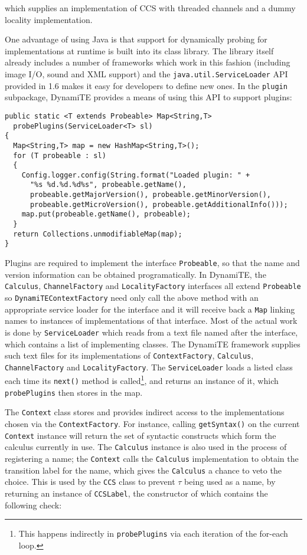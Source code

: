 \noindent which supplies an implementation of CCS with threaded
channels and a dummy locality implementation.

One advantage of using Java is that support for dynamically probing
for implementations at runtime is built into its class library.  The
library itself already includes a number of frameworks which work in
this fashion (including image I/O, sound and XML support) and the
\texttt{java.util.ServiceLoader} API provided in 1.6 makes it easy for
developers to define new ones.  In the \texttt{plugin} subpackage,
DynamiTE provides a means of using this API to support plugins:

\begin{verbatim}
public static <T extends Probeable> Map<String,T>
  probePlugins(ServiceLoader<T> sl)
{
  Map<String,T> map = new HashMap<String,T>();
  for (T probeable : sl)
  {
    Config.logger.config(String.format("Loaded plugin: " +
      "%s %d.%d.%d%s", probeable.getName(),
      probeable.getMajorVersion(), probeable.getMinorVersion(),
      probeable.getMicroVersion(), probeable.getAdditionalInfo()));
    map.put(probeable.getName(), probeable);
  }
  return Collections.unmodifiableMap(map);
}
\end{verbatim}

\noindent Plugins are required to implement the interface
\texttt{Probeable}, so that the name and version information can be
obtained programatically.  In DynamiTE, the \texttt{Calculus},
\texttt{ChannelFactory} and \texttt{LocalityFactory} interfaces all
extend \texttt{Probeable} so \texttt{DynamiTEContextFactory} need only
call the above method with an appropriate service loader for the
interface and it will receive back a \texttt{Map} linking names to
instances of implementations of that interface.  Most of the actual
work is done by \texttt{ServiceLoader} which reads from a text file
named after the interface, which contains a list of implementing
classes.  The DynamiTE framework supplies such text files for its
implementations of \texttt{ContextFactory}, \texttt{Calculus},
\texttt{ChannelFactory} and \texttt{LocalityFactory}.  The
\texttt{ServiceLoader} loads a listed class each time its
\texttt{next()} method is called\footnote{This happens indirectly in
  \texttt{probePlugins} via each iteration of the for-each loop.}, and
returns an instance of it, which \texttt{probePlugins} then stores in
the map.

The \texttt{Context} class stores and provides indirect access to the
implementations chosen via the \texttt{ContextFactory}.  For instance,
calling \texttt{getSyntax()} on the current \texttt{Context} instance
will return the set of syntactic constructs which form the calculus
currently in use.  The \texttt{Calculus} instance is also used in the
process of registering a name; the \texttt{Context} calls the
\texttt{Calculus} implementation to obtain the transition label for
the name, which gives the \texttt{Calculus} a chance to veto the
choice.  This is used by the \texttt{CCS} class to prevent $\tau$
being used as a name, by returning an instance of \texttt{CCSLabel},
the constructor of which contains the following check:

